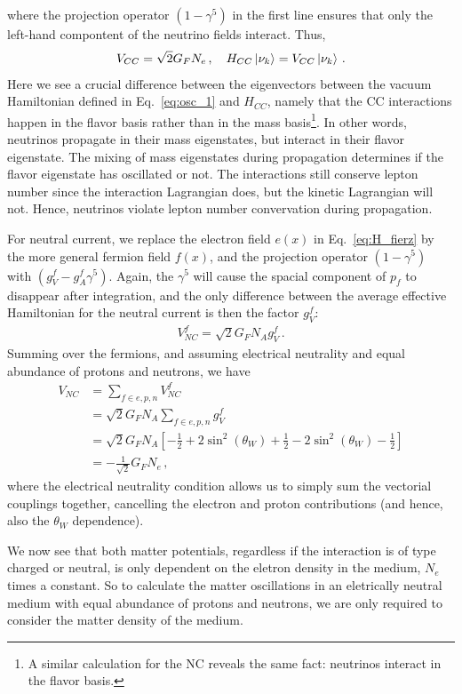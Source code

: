 where the projection operator $(1- \gamma^5)$ in the first line ensures that only the left-hand compontent of the neutrino fields interact. Thus,
\begin{align}\label{eq:V_CC1}
    V_{CC} = \sqrt{2}G_F N_e\,, \quad H_{CC}\ket{\nu_k} = V_{CC}\ket{\nu_k}\,.
\end{align}
Here we see a crucial difference between the eigenvectors between the vacuum Hamiltonian defined in Eq.~\ref{eq:osc_1} and $H_{CC}$, namely
that the CC interactions happen in the flavor basis rather than in the mass basis\footnote{A similar calculation for the NC reveals the same fact:
neutrinos interact in the flavor basis.}. In other words,
neutrinos propagate in their mass eigenstates, but interact in their flavor eigenstate. The mixing of mass eigenstates during propagation
determines if the flavor eigenstate has oscillated or not. The interactions still conserve lepton number since the interaction Lagrangian does,
but the kinetic Lagrangian will not. Hence, neutrinos violate lepton number convervation during propagation.

For neutral current, we replace the electron field $e(x)$ in Eq.~\ref{eq:H_fierz} by the more general fermion field $f(x)$, and the projection operator 
$(1-\gamma^5)$ with $(g_V^f - g_A^f\gamma^5)$. Again, the $\gamma^5$ will cause the spacial component of $p_f$ to disappear after integration, and the 
only difference between the average effective Hamiltonian for the neutral current is then the factor $g_V^f$:
\begin{align}
    V^f_{NC} = \sqrt{2}G_F N_A g_V^f\,.
\end{align}
Summing over the fermions, and assuming electrical neutrality and equal abundance of protons and neutrons, we have
\begin{align}
    V_{NC} &= \sum_{f \in {e,p,n}} V^f_{NC} \nonumber \\
           &= \sqrt{2}G_F N_A \sum_{f \in {e,p,n}} g_V^f \nonumber \\
           &= \sqrt{2}G_F N_A\left[ -\frac{1}{2}+2\sin^2{(\theta_W)} + \frac{1}{2}-2\sin^2{(\theta_W)} -\frac{1}{2} \right] \nonumber \\
           &= -\frac{1}  {\sqrt{2}} G_F N_e\,,
\end{align}
where the electrical neutrality condition allows us to simply sum the vectorial couplings together, cancelling the electron and proton contributions (and hence, also the $\theta_W$ dependence).

We now see that both matter potentials, regardless if the interaction is of type charged or neutral, is only dependent on the eletron density in the medium, $N_e$ times a constant.
So to calculate the matter oscillations in an eletrically neutral medium with equal abundance of protons and neutrons, we are only required to consider the matter density of the medium.

